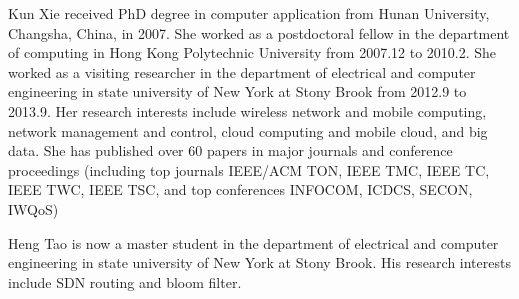 
\begin{IEEEbiography}{Kun Xie}
received  PhD
degree in computer application from Hunan University, Changsha, China,
in  2007. She worked as a postdoctoral fellow
in the department of computing in Hong Kong Polytechnic University from
2007.12 to 2010.2. She worked as a visiting researcher in the department
of electrical and computer engineering in state university of New York at
Stony Brook from 2012.9 to 2013.9. Her research interests include wireless network and mobile
computing, network management and control, cloud computing and mobile
cloud, and big data. She has published over 60 papers in major journals and conference proceedings
(including top journals IEEE/ACM TON, IEEE TMC, IEEE TC, IEEE TWC, IEEE TSC, and top conferences INFOCOM, ICDCS, SECON, IWQoS)
\end{IEEEbiography}
\begin{IEEEbiography}{Heng Tao}
 is now a master student in the department of electrical and computer engineering in state university of New York at
Stony Brook. His research interests include SDN routing and bloom filter.
\end{IEEEbiography}
